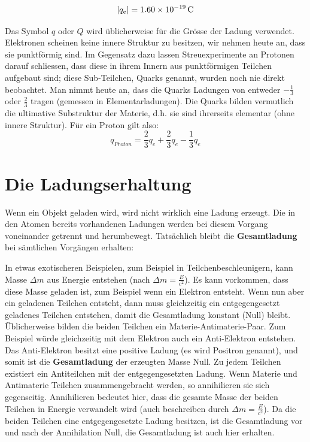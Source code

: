 \documentclass[11pt,twoside=false,open=any]{scrbook}
\begin{document}
\[ | q_{e} | = \SI{1.60E-19}{\coulomb} \]

Das Symbol $q$ oder $Q$ wird üblicherweise für die Grösse der Ladung verwendet.
Elektronen scheinen keine innere Struktur zu besitzen, wir nehmen heute an, dass sie punktförmig sind. Im Gegensatz dazu lassen Streuexperimente an Protonen darauf schliessen, dass diese in ihrem Innern aus punktförmigen Teilchen aufgebaut sind; diese Sub-Teilchen, Quarks genannt, wurden noch nie direkt beobachtet. Man nimmt heute an, dass die Quarks Ladungen von entweder $-\frac{1}{3}$ oder $\frac{2}{3}$ tragen (gemessen in Elementarladungen). Die Quarks bilden vermutlich die ultimative Substruktur der Materie, d.h. sie sind ihrerseits elementar (ohne innere Struktur). Für ein Proton gilt also:
\[ q_{Proton} = \frac{2}{3}q_{e} + \frac{2}{3}q_{e} -\frac{1}{3}q_{e} \]
\section{Die Ladungserhaltung}
Wenn ein Objekt geladen wird, wird nicht wirklich eine Ladung erzeugt. Die in den Atomen bereits vorhandenen Ladungen werden bei diesem Vorgang voneinander getrennt und herumbewegt. Tatsächlich bleibt die \textbf{Gesamtladung} bei sämtlichen Vorgängen erhalten:
\begin{center}
   \setlength{\fboxrule}{3pt}
\end{center}

In etwas exotischeren Beispielen, zum Beispiel in Teilchenbeschleunigern, kann Masse $\Delta m$ aus Energie entstehen (nach $\Delta m = \frac{E}{c^2}$). Es kann vorkommen, dass diese Masse geladen ist, zum Beispiel wenn ein Elektron entsteht. Wenn nun aber ein geladenen Teilchen entsteht, dann muss gleichzeitig ein entgegengesetzt geladenes Teilchen entstehen, damit die Gesamtladung konstant (Null) bleibt. Üblicherweise bilden die beiden Teilchen ein Materie-Antimaterie-Paar. Zum Beispiel würde gleichzeitig mit dem Elektron auch ein Anti-Elektron entstehen. Das Anti-Elektron besitzt eine positive Ladung (es wird Positron genannt), und somit ist die \textbf{Gesamtladung} der erzeugten Masse Null. Zu jedem Teilchen existiert ein Antiteilchen mit der entgegengesetzten Ladung. Wenn Materie und Antimaterie Teilchen zusammengebracht werden, so annihilieren sie sich gegenseitig. Annihilieren bedeutet hier, dass die gesamte Masse der beiden Teilchen in Energie verwandelt wird (auch beschreiben durch $\Delta m = \frac{E}{c^2}$). Da die beiden Teilchen eine entgegengesetzte Ladung besitzen, ist die Gesamtladung vor und nach der Annihilation Null, die Gesamtladung ist auch hier erhalten. 
\end{document}
